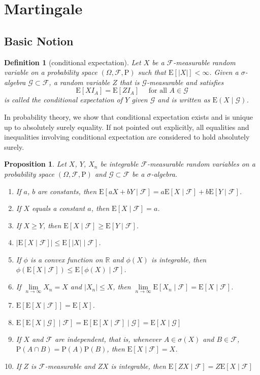 \documentclass{article}
\newtheorem{definition}{Definition}[section]
\newtheorem{proposition}{Proposition}[section]
\theoremstyle{nonumberplain}
\begin{document}
\section{Martingale}
\subsection{Basic Notion}
\begin{definition}[conditional expectation]
	Let $X$ be a $\mathcal{F}$-measurable random variable on a probability space $(\Omega,\mathcal{F},\mathrm{P})$ such that $\mathrm{E}[|X|] < \infty$. Given a $\sigma$-algebra $\mathcal{G}\subset\mathcal{F}$, a random variable $Z$ that is $\mathcal{G}$-measurable and satisfies 
	\[
	\mathrm{E}[X I_A] = \mathrm{E}[ZI_A] \quad\text{ for all }A \in \mathcal{G}
	\] 
	is called the \emph{conditional expectation} of $Y$ given $\mathcal{G}$ and is written as $\mathrm{E}(X\mid\mathcal{G})$.
\end{definition}
In probability theory, we show that conditional expectation exists and is unique up to absolutely surely equality. If not pointed out explicitly, all equalities and inequalities involving conditional expectation are considered to hold absolutely surely. 
\begin{proposition}
	Let $X$, $Y$, $X_n$ be integrable $\mathcal{F}$-measurable random variables on a probability space $(\Omega,\mathcal{F},\mathrm{P})$ and  $\mathcal{G}\subset\mathcal{F}$ be a $\sigma$-algebra.
	\begin{enumerate}  
		\item If $a$, $b$ are constants, then $\mathrm{E}[aX+bY\mid\mathcal{F}]=a\mathrm{E}[X\mid\mathcal{F}]+b\mathrm{E}[Y\mid\mathcal{F}]$.
		\item If $X$ equals a constant $a$, then $\mathrm{E}[X\mid\mathcal{F}]=a$.
		\item If $X\ge Y$,  then $\mathrm{E}[X\mid\mathcal{F}]\ge\mathrm{E}[Y\mid\mathcal{F}]$.
		\item $|\mathrm{E}[X\mid\mathcal{F}]|\le\mathrm{E}[|X|\mid\mathcal{F}]$.
		\item If $\phi$ is a convex function on $\mathbb{R}$ and $\phi(X)$ is integrable, then $\phi(\mathrm{E}[X\mid\mathcal{F}])\le\mathrm{E}[\phi(X)\mid\mathcal{F}]$.
		\item If $\lim\limits_{n\to\infty}X_n=X$ and $|X_n|\le X$, then $\lim\limits_{n\to\infty}\mathrm{E}[X_n\mid\mathcal{F}]=\mathrm{E}[X\mid\mathcal{F}]$.
		\item $\mathrm{E}[\mathrm{E}[X\mid\mathcal{F}]]=\mathrm{E}[X]$.
		\item $\mathrm{E}[\mathrm{E}[X\mid\mathcal{G}]\mid\mathcal{F}]=\mathrm{E}[\mathrm{E}[X\mid\mathcal{F}]\mid\mathcal{G}]=\mathrm{E}[X\mid\mathcal{G}]$
		\item If $X$ and $\mathcal{F}$ are independent, that is, whenever $A\in\sigma(X)$ and $B\in\mathcal{F}$, $\mathrm{P}(A\cap B)= \mathrm{P}(A) \mathrm{P}(B)$, then $\mathrm{E}[X\mid\mathcal{F}]=X$.
		\item If $Z$ is $\mathcal{F}$-measurable and $ZX$ is integrable, then $\mathrm{E}[ZX\mid\mathcal{F}]=Z\mathrm{E}[X\mid\mathcal{F}]$
	\end{enumerate}
\end{proposition}
\end{document}
